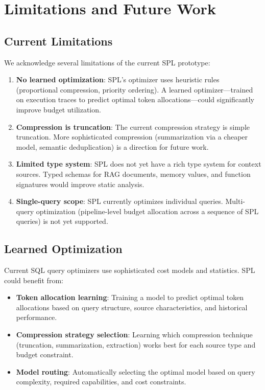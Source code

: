 \documentclass[11pt,a4paper]{article}
\begin{document}
\section{Limitations and Future Work}
\label{sec:discussion}

\subsection{Current Limitations}

We acknowledge several limitations of the current SPL prototype:

\begin{enumerate}[nosep]
  \item \textbf{No learned optimization}: SPL's optimizer uses heuristic rules (proportional compression, priority ordering). A learned optimizer---trained on execution traces to predict optimal token allocations---could significantly improve budget utilization.
  \item \textbf{Compression is truncation}: The current compression strategy is simple truncation. More sophisticated compression (summarization via a cheaper model, semantic deduplication) is a direction for future work.
  \item \textbf{Limited type system}: SPL does not yet have a rich type system for context sources. Typed schemas for RAG documents, memory values, and function signatures would improve static analysis.
  \item \textbf{Single-query scope}: SPL currently optimizes individual queries. Multi-query optimization (pipeline-level budget allocation across a sequence of SPL queries) is not yet supported.
\end{enumerate}

\subsection{Learned Optimization}

Current SQL query optimizers use sophisticated cost models and statistics. SPL could benefit from:

\begin{itemize}[nosep]
  \item \textbf{Token allocation learning}: Training a model to predict optimal token allocations based on query structure, source characteristics, and historical performance.
  \item \textbf{Compression strategy selection}: Learning which compression technique (truncation, summarization, extraction) works best for each source type and budget constraint.
  \item \textbf{Model routing}: Automatically selecting the optimal model based on query complexity, required capabilities, and cost constraints.
\end{itemize}
\end{document}
